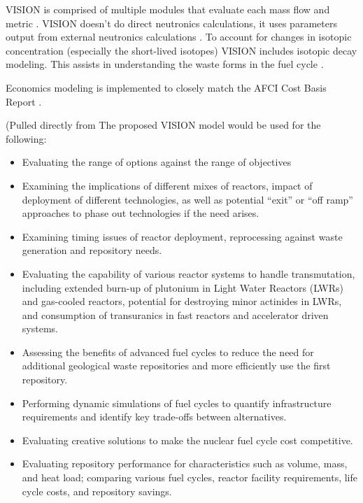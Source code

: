 \documentclass{article}
\begin{document}
    VISION is comprised of multiple modules that evaluate each mass flow and 
    metric \cite{yacout_visionverifiable_2006}. VISION doesn't do direct 
    neutronics calculations, it uses parameters output from external 
    neutronics calculations \cite{yacout_visionverifiable_2006}. To account 
    for changes in isotopic concentration (especially the short-lived 
    isotopes) VISION includes isotopic decay modeling. This assists in 
    understanding the waste forms in the fuel cycle \cite{yacout_visionverifiable_2006}.

    Economics modeling is implemented to closely match the AFCI Cost Basis 
    Report \cite{yacout_visionverifiable_2006}. 

    (Pulled directly from \cite{yacout_visionverifiable_2006} The proposed VISION 
    model would be used for the following:
    \begin{itemize}
        \item Evaluating the range of options against the range of objectives
        \item Examining the implications of different mixes of reactors, impact of deployment of
        different technologies, as well as potential “exit” or “off ramp” approaches to phase out
        technologies if the need arises.
        \item Examining timing issues of reactor deployment, reprocessing against waste generation
        and repository needs.
        \item Evaluating the capability of various reactor systems to handle transmutation, including
        extended burn-up of plutonium in Light Water Reactors (LWRs) and gas-cooled reactors,
        potential for destroying minor actinides in LWRs, and consumption of transuranics in fast
        reactors and accelerator driven systems.
        \item Assessing the benefits of advanced fuel cycles to reduce the need for additional
        geological waste repositories and more efficiently use the first repository.
        \item Performing dynamic simulations of fuel cycles to quantify infrastructure requirements
        and identify key trade-offs between alternatives.
        \item Evaluating creative solutions to make the nuclear fuel cycle cost competitive.
        \item Evaluating repository performance for characteristics such as volume, mass, and heat
        load; comparing various fuel cycles, reactor facility requirements, life cycle costs, and
        repository savings.
    \end{itemize}
\end{document}

